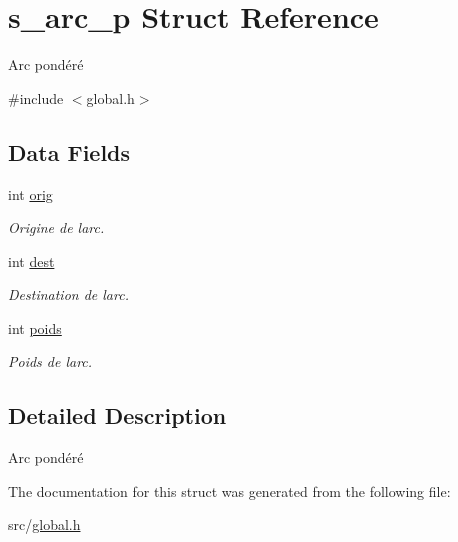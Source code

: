 \hypertarget{structs__arc__p}{}\section{s\+\_\+arc\+\_\+p Struct Reference}
\label{structs__arc__p}


Arc pondéré  




{\ttfamily \#include $<$global.\+h$>$}

\subsection*{Data Fields}
\begin{DoxyCompactItemize}
\item 
\mbox{\label{structs__arc__p_a9e217f04c0fbbe53b5ad22ba4eb2af25}} 
int \mbox{\hyperlink{structs__arc__p_a9e217f04c0fbbe53b5ad22ba4eb2af25}{orig}}
\begin{DoxyCompactList}\small\item\em Origine de l\textquotesingle{}arc. \end{DoxyCompactList}\item 
\mbox{\label{structs__arc__p_ae5163ff230abd4115d86194ad89467b5}} 
int \mbox{\hyperlink{structs__arc__p_ae5163ff230abd4115d86194ad89467b5}{dest}}
\begin{DoxyCompactList}\small\item\em Destination de l\textquotesingle{}arc. \end{DoxyCompactList}\item 
\mbox{\label{structs__arc__p_ac1abe8fa63a4167cf11ef707f524f0c4}} 
int \mbox{\hyperlink{structs__arc__p_ac1abe8fa63a4167cf11ef707f524f0c4}{poids}}
\begin{DoxyCompactList}\small\item\em Poids de l\textquotesingle{}arc. \end{DoxyCompactList}\end{DoxyCompactItemize}


\subsection{Detailed Description}
Arc pondéré 

The documentation for this struct was generated from the following file\+:\begin{DoxyCompactItemize}
\item 
src/\mbox{\hyperlink{global_8h}{global.\+h}}\end{DoxyCompactItemize}
